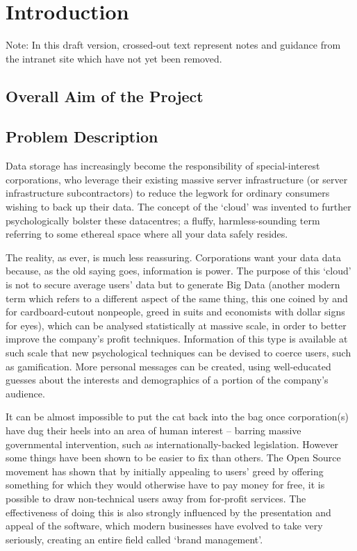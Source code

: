 \documentclass[12pt,a4paper,]{adreport}
\author{}
\date{}
\begin{document}
{
\hypersetup{linkcolor=black}
\setcounter{tocdepth}{2}
\tableofcontents
}
\chapter{Introduction}\label{introduction}

Note: In this draft version, crossed-out text represent notes and
guidance from the intranet site which have not yet been removed.

\section{Overall Aim of the Project}\label{overall-aim-of-the-project}

\section{Problem Description}\label{problem-description}

Data storage has increasingly become the responsibility of
special-interest corporations, who leverage their existing massive
server infrastructure (or server infrastructure subcontractors) to
reduce the legwork for ordinary consumers wishing to back up their data.
The concept of the `cloud' was invented to further psychologically
bolster these datacentres; a fluffy, harmless-sounding term referring to
some ethereal space where all your data safely resides.

The reality, as ever, is much less reassuring. Corporations want your
data data because, as the old saying goes, information is power. The
purpose of this `cloud' is not to secure average users' data but to
generate Big Data (another modern term which refers to a different
aspect of the same thing, this one coined by and for cardboard-cutout
nonpeople, greed in suits and economists with dollar signs for eyes),
which can be analysed statistically at massive scale, in order to better
improve the company's profit techniques. Information of this type is
available at such scale that new psychological techniques can be devised
to coerce users, such as gamification. More personal messages can be
created, using well-educated guesses about the interests and
demographics of a portion of the company's audience.

It can be almost impossible to put the cat back into the bag once
corporation(s) have dug their heels into an area of human interest --
barring massive governmental intervention, such as
internationally-backed legislation. However some things have been shown
to be easier to fix than others. The Open Source movement has shown that
by initially appealing to users' greed by offering something for which
they would otherwise have to pay money for free, it is possible to draw
non-technical users away from for-profit services. The effectiveness of
doing this is also strongly influenced by the presentation and appeal of
the software, which modern businesses have evolved to take very
seriously, creating an entire field called `brand management'.
\end{document}
